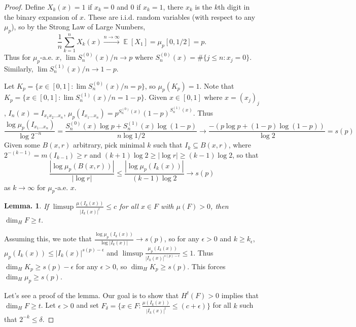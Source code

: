 \documentclass[11pt, a4paper]{memoir}
\newcommand{\fto}[1]{\ensuremath{\xrightarrow{\scriptstyle{#1}}}}
\theoremstyle{change}
\newtheorem{lemma}[theorem]{Lemma.}
\theoremstyle{plain}
\theoremstyle{nonumberplain}
\newtheorem{proof}{Proof}
\DeclareMathOperator{\E}{{\mathbb{E}}}
\numberwithin{equation}{section}
\begin{document}
\begin{proof}
    Define $X_k(x)=1$ if $x_k=0$ and $0$ if $x_k=1$, there $x_k$ is the $k$th digit in the binary expansion of $x$.
    These are i.i.d. random variables (with respect to any $\mu_p$), so by the Strong Law of Large Numbers,
    \begin{equation*}
        \frac{1}{n}\sum_{k=1}^n X_k(x)\fto{n\to\infty}\E[X_1]=\mu_p[0,1/2]=p.
    \end{equation*}
    Thus for $\mu_p$-a.e. $x$, $\lim S_n^{(0)}(x)/n\to p$ where $S_n^{(0)}(x)=\#\{j\leq n:x_j=0\}$.
    Similarly, $\lim S_n^{(1)}(x)/n\to 1-p$.

    Let $K_p=\{x\in[0,1]:\lim S_n^{(0)}(x)/n=p\}$, so $\mu_p(K_p)=1$.
    Note that $K_p=\{x\in[0,1]:\lim S_n^{(1)}(x)/n=1-p\}$.
    Given $x\in[0,1]$ where $x=(x_j)_j$, $I_n(x)=I_{x_1x_2\ldots x_n}$, $\mu_p(I_{x_1\ldots x_n})=p^{S_n^{(0)}(x)}(1-p)^{S_n^{(1)}(x)}$.
    Thus
    \begin{equation*}
        \frac{\log\mu_p(I_{x_1\ldots x_n})}{\log 2^{-n}}=\frac{S_n^{(0)}(x)\log p+S_n^{(1)}(x)\log(1-p)}{n\log 1/2}\to\frac{-(p\log p+(1-p)\log(1-p))}{\log 2}=s(p)
    \end{equation*}
    Given some $B(x,r)$ arbitrary, pick minimal $k$ such that $I_k\subseteq B(x,r)$, where $2^{-(k-1)}=m(I_{k-1})\geq r$ and $(k+1)\log 2\geq|\log r|\geq(k-1)\log 2$, so that
    \begin{equation*}
        \frac{|\log\mu_p(B(x,r))|}{|\log r|}\leq\frac{|\log\mu_p(I_k(x))|}{(k-1)\log 2}\to s(p)
    \end{equation*}
    as $k\to\infty$ for $\mu_p$-a.e. $x$.
    \begin{lemma}
        If $\limsup\frac{\mu(I_k(x))}{|I_k(x)|^t}\leq c$ for all $x\in F$ with $\mu(F)>0$, then $\dim_H F\geq t$.
    \end{lemma}
    Assuming this, we note that $\frac{\log\mu_p(I_k(x))}{\log|I_k(x)|}\to s(p)$, so for any $\epsilon>0$ and $k\geq k_\epsilon$, $\mu_p(I_k(x))\leq |I_k(x)|^{s(p)-\epsilon}$ and $\limsup\frac{\mu_p(I_k(x))}{|I_k(x)|^{s(p)-\epsilon}}\leq 1$.
    Thus $\dim_H K_p\geq s(p)-\epsilon$ for any $\epsilon>0$, so $\dim_H K_p\geq s(p)$.
    This forces $\dim_H\mu_p\geq s(p)$.

    Let's see a proof of the lemma.
    Our goal is to show that $H^t(F)>0$ implies that $\dim_H F\geq t$.
    Let $\epsilon>0$ and set $F_\delta=\{x\in F:\frac{\mu(I_k(x))}{|I_k(x)|^t}\leq(c+\epsilon)\}$ for all $k$ such that $2^{-k}\leq\delta$.


\end{proof}
\end{document}
